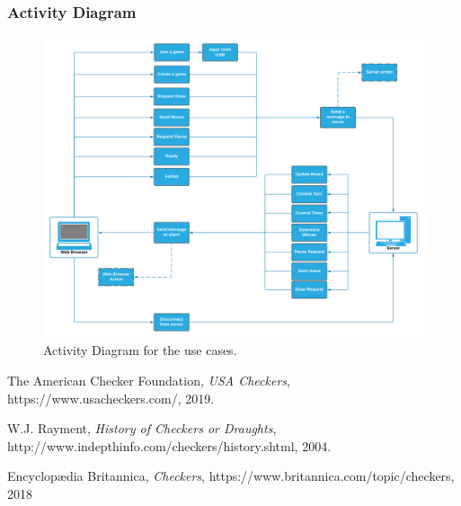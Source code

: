 \documentclass[10pt]{article}
\begin{document}
\subsubsection{Activity Diagram}
\begin{figure}[h!]
    \centering
    \includegraphics[width=16cm]{UseCaseDiagram.png}
    \caption{Activity Diagram for the use cases.}
\end{figure}


\begin{thebibliography}{9}

  The American Checker Foundation,
  \textit{USA Checkers},
  https://www.usacheckers.com/,
  2019.

W.J. Rayment,
\textit{History of Checkers or Draughts},
http://www.indepthinfo.com/checkers/history.shtml,
2004.

Encyclopædia Britannica,
\textit{Checkers},
https://www.britannica.com/topic/checkers,
2018
\end{thebibliography}
\end{document}
